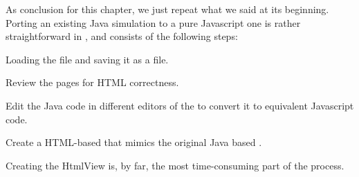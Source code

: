 As conclusion for this chapter, we just repeat what we said at its beginning. Porting an existing Java simulation to a pure Javascript one is rather straightforward in \ejs, and consists of the following steps:

\begin{numberlist}

  \item Loading the  file and saving it as a  file.
  \item Review the  pages for HTML correctness.
  \item Edit the Java code in different editors of the  to convert it to equivalent Javascript code. 
  \item Create a HTML-based  that mimics the original Java based .   
\end{numberlist}

\noindent Creating the HtmlView is, by far, the most time-consuming part of the process.





